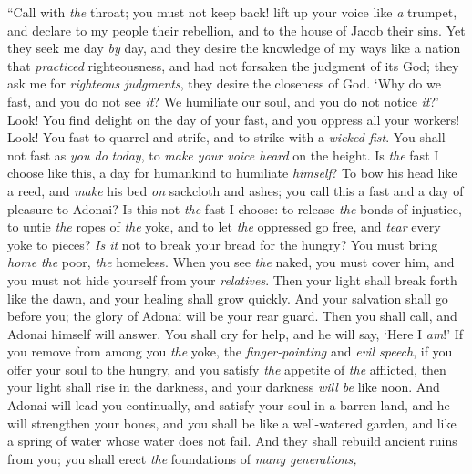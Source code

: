 \begin{biblechapter} %
 “Call with \textit{the} throat; you must not keep back! 
lift up your voice like \textit{a} trumpet, 
and declare to my people their rebellion, 
and to the house of Jacob their sins.
\verse Yet they seek me day \textit{by} day, 
and they desire the knowledge of my ways 
like a nation that \textit{practiced} righteousness, 
and had not forsaken the judgment of its God; 
they ask me for \textit{righteous judgments}, 
they desire the closeness of God.
\verse ‘Why do we fast, and you do not see \textit{it}? 
We humiliate our soul, and you do not notice \textit{it}?’ 
Look! You find delight on the day of your fast, 
and you oppress all your workers!
\verse Look! You fast to quarrel and strife, 
and to strike with a \textit{wicked fist}. 
You shall not fast as \textit{you do} \textit{today}, 
to \textit{make your voice heard} on the height.
\verse Is \textit{the} fast I choose like this, 
a day for humankind to humiliate \textit{himself}? 
To bow his head like a reed, 
and \textit{make} his bed \textit{on} sackcloth and ashes; 
you call this a fast 
and a day of pleasure to Adonai?
\verse Is this not \textit{the} fast I choose: to release \textit{the} bonds of injustice, 
to untie \textit{the} ropes of \textit{the} yoke, 
and to let \textit{the} oppressed go free, 
and \textit{tear} every yoke to pieces?
\verse \textit{Is it} not to break your bread for the hungry? 
You must bring \textit{home} \textit{the} poor, \textit{the} homeless. 
When you see \textit{the} naked, you must cover him, 
and you must not hide yourself from your \textit{relatives}.
\verse Then your light shall break forth like the dawn, 
and your healing shall grow quickly. 
And your salvation shall go before you; 
the glory of Adonai will be your rear guard.
\verse Then you shall call, and Adonai himself will answer. 
You shall cry for help, and he will say, ‘Here I \textit{am}!’ 
If you remove from among you \textit{the} yoke, 
the \textit{finger-pointing} and \textit{evil speech},
\verse if you offer your soul to the hungry, 
and you satisfy \textit{the} appetite of \textit{the} afflicted, 
then your light shall rise in the darkness, 
and your darkness \textit{will be} like noon.
\verse And Adonai will lead you continually, and satisfy your soul in a barren land, 
and he will strengthen your bones, 
and you shall be like a well-watered garden, 
and like a spring of water whose water does not fail.
\verse And they shall rebuild ancient ruins from you; 
you shall erect \textit{the} foundations of \textit{many generations,} 

\end{biblechapter}

